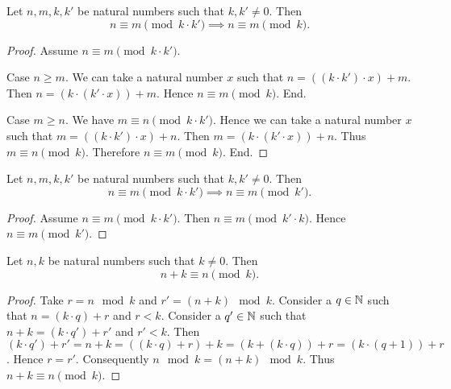 \documentclass[../arithmetic.tex]{subfiles}
\begin{document}
  \begin{forthel}
    \begin{proposition}
      Let $n, m, k, k'$ be natural numbers such that $k, k' \neq 0$.
      Then \[ n \equiv m \pmod{k \cdot k'} \implies n \equiv m \pmod{k}. \]
    \end{proposition}
    \begin{proof}
      Assume $n \equiv m \pmod{k \cdot k'}$.

      Case $n \geq m$.
        We can take a natural number $x$ such that
        $n = ((k \cdot k') \cdot x) + m$.
        Then $n = (k \cdot (k' \cdot x)) + m$.
        Hence $n \equiv m \pmod{k}$.
      End.

      Case $m \geq n$.
        We have $m \equiv n \pmod{k \cdot k'}$.
        Hence we can take a natural number $x$ such that
        $m = ((k \cdot k') \cdot x) + n$.
        Then $m = (k \cdot (k' \cdot x)) + n$.
        Thus $m \equiv n \pmod{k}$.
        Therefore $n \equiv m \pmod{k}$.
      End.
    \end{proof}
  \end{forthel}

  \begin{forthel}
    \begin{corollary}
      Let $n, m, k, k'$ be natural numbers such that $k, k' \neq 0$.
      Then \[ n \equiv m \pmod{k \cdot k'} \implies n \equiv m \pmod{k'}. \]
    \end{corollary}
    \begin{proof}
      Assume $n \equiv m \pmod{k \cdot k'}$.
      Then $n \equiv m \pmod{k' \cdot k}$.
      Hence $n \equiv m \pmod{k'}$.
    \end{proof}
  \end{forthel}

  \begin{forthel}
    \begin{proposition}
      Let $n, k$ be natural numbers such that $k \neq 0$.
      Then \[ n + k \equiv n \pmod{k}. \]
    \end{proposition}
    \begin{proof}
      Take $r = n \mod k$ and $r' = (n + k) \mod k$.
      Consider a $q \in \mathbb{N}$ such that $n = (k \cdot q) + r$ and $r < k$.
      Consider a $q' \in \mathbb{N}$ such that $n + k = (k \cdot q') + r'$ and
      $r' < k$.
      Then $(k \cdot q') + r'
        = n + k
        = ((k \cdot q) + r) + k
        = (k + (k \cdot q)) + r
        = (k \cdot (q + 1)) + r$.
      Hence $r = r'$.
      Consequently $n \mod k = (n + k) \mod k$.
      Thus $n + k \equiv n \pmod{k}$.
    \end{proof}
  \end{forthel}
\end{document}

